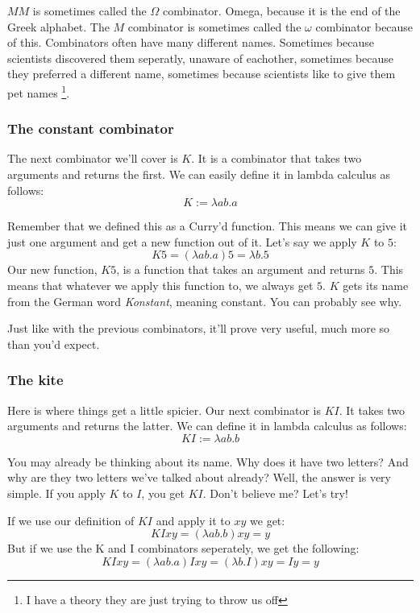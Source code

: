 \documentclass[11pt]{article}
\begin{document}
\(M M\) is sometimes called the \(\Omega\) combinator. Omega, because it is the
end of the Greek alphabet. The \(M\) combinator is sometimes called the
\(\omega\) combinator because of this. Combinators often have many different
names. Sometimes because scientists discovered them seperatly, unaware of
eachother, sometimes because they preferred a different name, sometimes because
scientists like to give them pet names \footnote{I have a theory they are just
trying to throw us off}.

\subsubsection{The constant combinator}\label{constant}

The next combinator we'll cover is \(K\). It is a combinator that takes two
arguments and returns the first. We can easily define it in lambda calculus as
follows:
\[K:=\lambda ab.a\]

Remember that we defined this as a Curry'd function. This means we can give it
just one argument and get a new function out of it. Let's say we apply \(K\) to
\(5\):
\[K5=(\lambda ab.a)5=\lambda b.5\]
Our new function, \(K5\), is a function that takes an argument and returns
\(5\). This means that whatever we apply this function to, we always get \(5\).
\(K\) gets its name from the German word \emph{Konstant}, meaning constant. You
can probably see why.

Just like with the previous combinators, it'll prove very useful, much more so
than you'd expect.

\subsubsection{The kite}

Here is where things get a little spicier. Our next combinator is \(KI\). It
takes two arguments and returns the latter. We can define it in lambda calculus
as follows:
\[KI:=\lambda ab.b\]

You may already be thinking about its name. Why does it have two letters? And
why are they two letters we've talked about already? Well, the answer is very
simple. If you apply \(K\) to \(I\), you get \(KI\). Don't believe me? Let's
try!

If we use our definition of \(KI\) and apply it to \(xy\) we get:
\[KIxy=(\lambda ab.b)xy=y\]
But if we use the K and I combinators seperately, we get the following:
\[KIxy=(\lambda ab.a)Ixy=(\lambda b.I)xy=Iy=y\]
\end{document}
